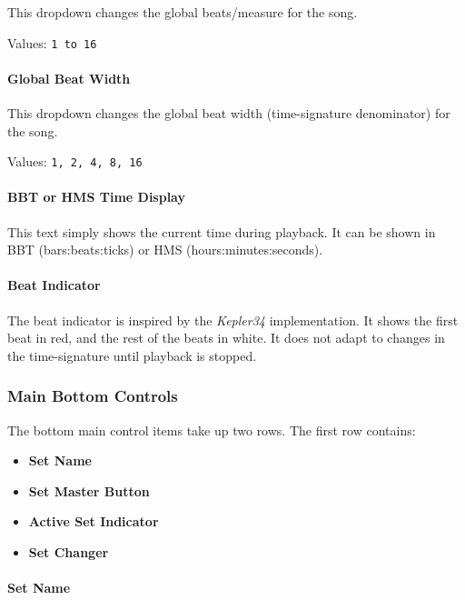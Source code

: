 \documentclass[
 11pt,
 twoside,
 a4paper,
 headinclude,
 footinclude,
 final                                 %
]{article}
\begin{document}
   This dropdown changes the global beats/measure for the song.

   Values: \texttt{1 to 16}

\paragraph{Global Beat Width}
\label{paragraph:introduction_global_beat_width}

   This dropdown changes the global beat width (time-signature denominator)
   for the song.

   Values: \texttt{1, 2, 4, 8, 16}

\paragraph{BBT or HMS Time Display}
\label{paragraph:introduction_time_display}

   This text simply shows the current time during playback. 
   It can be shown in BBT (bars:beats:ticks) or HMS (hours:minutes:seconds).

\paragraph{Beat Indicator}
\label{paragraph:introduction_beat_indicator}

   The beat indicator is inspired by the \textsl{Kepler34} implementation.  It
   shows the first beat in red, and the rest of the beats in white.
   It does not adapt to changes in the time-signature until
   playback is stopped.

\subsubsection{Main Bottom Controls}
\label{subsubsec:introduction_main_bottom_controls}

   The bottom main control items take up two rows.  The first row contains:

   \begin{itemize}
      \item \textbf{Set Name}
      \item \textbf{Set Master Button}
      \item \textbf{Active Set Indicator}
      \item \textbf{Set Changer}
   \end{itemize}

\paragraph{Set Name}
\label{paragraph:introduction_Set_Name}
\end{document}
